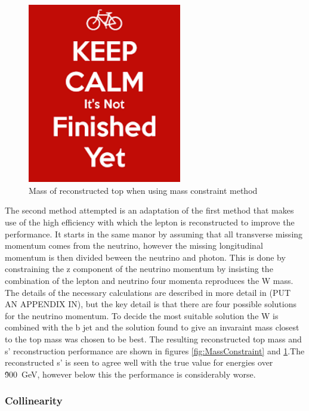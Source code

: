 \begin{figure}
  \centering
  \includegraphics[width=0.6\textwidth]{figures/dummy}
  \caption[Mass of reconstructed top when using mass constraint method]{Mass of reconstructed top when using mass constraint method}
  \label{fig:TopMassFrommassMethod}
\end{figure}

The second method attempted is an adaptation of the first method that makes use of the high efficiency with which the lepton is reconstructed to improve the performance. It starts in the same manor by assuming that all transverse missing momentum comes from the neutrino, however the missing longitudinal momentum is then divided beween the neutrino and photon. This is done by constraining the z component of the neutrino momentum by insisting the combination of the lepton and neutrino four momenta reproduces the W mass. The details of the necessary calculations are described in more detail in (PUT AN APPENDIX IN), but the key detail is that there are four possible solutions for the neutrino momentum. To decide the most suitable solution the W is combined with the b jet and the solution found to give an invaraint mass closest to the top mass was chosen to be best. The resulting reconstructed top mass and s' reconstruction performance are shown in figures \ref{fig:MassConstraint} and \ref{fig:TopMassFrommassMethod}.The reconstructed s' is seen to agree well with the true value for energies over \~900~GeV, however below this the performance is considerably worse.

\subsubsection{Collinearity}

